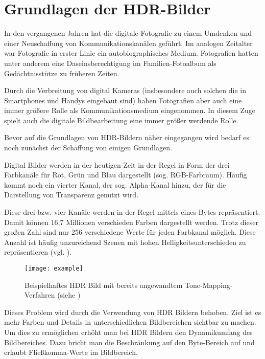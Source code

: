
\chapter{Grundlagen der HDR-Bilder}
\label{chap:hdr}


In den vergangenen Jahren hat die digitale Fotografie zu einem Umdenken und einer Neuschaffung von Kommunikationskanälen geführt. Im analogen Zeitalter war Fotografie in erster Linie ein autobiographisches Medium. Fotografien hatten unter anderem eine Daseinsberechtigung im Familien-Fotoalbum als Gedächtnisstütze zu früheren Zeiten.

Durch die Verbreitung von digital Kameras (insbesondere auch solchen die in Smartphones und Handys eingebaut sind) haben Fotografien aber auch eine immer größere Rolle als Kommunikationsmedium eingenommen. 
In diesem Zuge spielt auch die digitale Bildbearbeitung eine immer größer werdende Rolle. 

Bevor auf die Grundlagen von \gls{HDR}-Bildern näher eingegangen wird bedarf es noch zunächst der Schaffung von einigen Grundlagen.

Digital Bilder werden in der heutigen Zeit in der Regel in Form der drei Farbkanäle für Rot, Grün und Blau dargestellt (sog. \gls{RGB-Farbraum}). Häufig kommt noch ein vierter Kanal, der sog. Alpha-Kanal hinzu, der für die Darstellung von Transparenz genutzt wird. 

Diese drei bzw. vier Kanäle werden in der Regel mittels eines Bytes repräsentiert. Damit können 16,7 Millionen verschieden Farben dargestellt werden. Trotz dieser großen Zahl sind nur 256 verschiedene Werte für jeden Farbkanal möglich. Diese Anzahl ist häufig unzureichend Szenen mit hohen Helligkeitsunterschieden zu repräsentieren (vgl. \cite[S.~1f]{Reinhard}).


\begin{figure}[h]
  \begin{center}
    \texttt{[image: example]}
    \caption{Beispielhaftes \gls{HDR} Bild mit bereits angewandtem Tone-Mapping-Verfahren (siehe \cite{tellone}) }
    \label{fig:teezer}
  \end{center}
\end{figure}

Dieses Problem wird durch die Verwendung von \gls{HDR} Bildern behoben. Ziel ist es mehr Farben und Details in unterschiedlichen Bildbereichen sichtbar zu machen. Um dies zu ermöglichen erhöht man bei \gls{HDR} Bildern den \gls{Dynamikumfang} des Bildbereiches. Dazu bricht man die Beschränkung auf den Byte-Bereich auf und erlaubt Fließkomma-Werte im Bildbereich.

